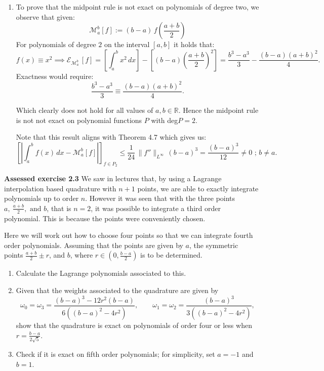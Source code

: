 \documentclass[]{article}
\begin{document}
\begin{enumerate}
\noindent Note that this result aligns with Theorem 4.7 which gives us:
\[
\displaystyle
\left[\left|\int_{a}^{b} f(x)\,dx - \mathcal{M}_{a}^{b}[f]\right|\right]_{f\in P_1}
\leq \frac{1}{24}\,\|f''\|_{L^\infty}\,(b-a)^{3} = \frac{1}{24}\cdot0\cdot (b-a)^3 = 0.
\]

\item To prove that the midpoint rule is not exact on polynomials of degree two, we observe that given:
\[
\displaystyle \mathcal{M}_{a}^{b}[f] := (b-a)\,f\left(\frac{a+b}{2}\right)
\]
  \noindent For polynomials of degree $2$ on the interval $[a,b]$ it holds that:
\[
f(x)\equiv x^2 \implies \displaystyle \mathcal{E}_{\mathcal{M}_{a}^{b}}\,[f]  = \left[\int_a^b x^2\,dx\right]-\left[\left(b-a\right)\left(\frac{a+b}{2}\right)^2\right] = \frac{b^3-a^3}{3} - \frac{(b-a)(a+b)^2}{4}.
\]
Exactness would require:
\[
\frac{b^3-a^3}{3} \equiv  \frac{(b-a)(a+b)^2}{4}.
\]

Which clearly does not hold for all values of $a,b \in \mathbb{R}$. Hence the midpoint rule is not not exact on polynomial functions $P$ with deg$P = 2$.\newline

\noindent Note that this result aligns with Theorem 4.7 which gives us:
\[
\displaystyle
\left[\left|\int_{a}^{b} f(x)\,dx - \mathcal{M}_{a}^{b}[f]\right|\right]_{f\in P_2}
\leq \frac{1}{24}\,\|f''\|_{L^\infty}\,(b-a)^{3} = \frac{\left(b-a\right)^3}{12} \neq 0 \, \, ;\, b\neq a.
\]
\end{enumerate}

\noindent\textbf{Assessed exercise 2.3}
We saw in lectures that, by using a Lagrange interpolation based quadrature with \(n+1\) points, we are able to exactly integrate polynomials up to order \(n\).
However it was seen that with the three points \(a,\ \frac{a+b}{2}, \text{ and } b\), that is \(n=2\), it was possible to integrate a third order polynomial. This is because the points were conveniently chosen.

Here we will work out how to choose four points so that we can integrate fourth order polynomials.
Assuming that the points are given by \(a\), the symmetric points \(\frac{a+b}{2}\pm r\), and \(b\), where \(r\in\left(0,\frac{b-a}{2}\right)\) is to be determined.

\begin{enumerate}
  \item Calculate the Lagrange polynomials associated to this.
  \item Given that the weights associated to the quadrature are given by
  \[
  \omega_0=\omega_3=\frac{(b-a)^3-12r^2(b-a)}{6\left((b-a)^2-4r^2\right)},
  \qquad
  \omega_1=\omega_2=\frac{(b-a)^3}{3\left((b-a)^2-4r^2\right)},
  \tag{1}
  \]
  show that the quadrature is exact on polynomials of order four or less when $  r=\frac{b-a}{2\sqrt{5}}$.
  \item Check if it is exact on fifth order polynomials; for simplicity, set \(a=-1\) and \(b=1\).
\end{enumerate}
\end{document}
